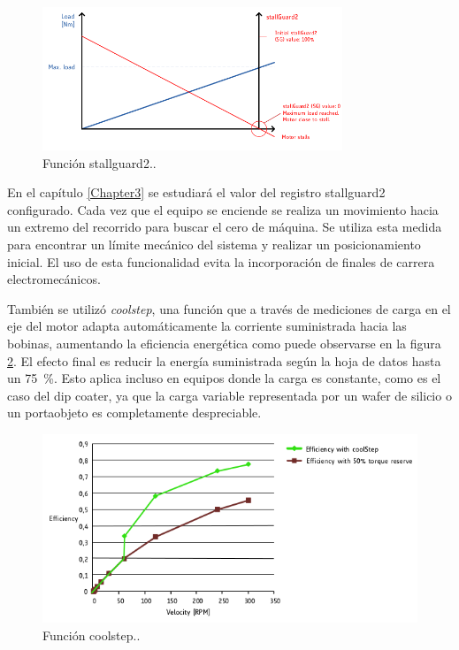 \begin{figure}[h]
\centering 
\includegraphics[width=0.8\textwidth]{./Figures/tmc5130_stallguard2.png}
\caption{Función stallguard2.\protect\footnotemark.}
\label{fig:tmc5130_stallGuard2}
\end{figure}


En el capítulo \ref{Chapter3} se estudiará el valor del registro  stallguard2 configurado. Cada vez que el equipo se enciende se realiza un movimiento hacia un extremo del recorrido para buscar el cero de máquina. Se utiliza esta medida para encontrar un límite mecánico del sistema y realizar  un posicionamiento inicial. El uso de esta funcionalidad evita la incorporación de finales de carrera electromecánicos.   


También se utilizó \textit{coolstep}, una función que a través de mediciones de carga en el eje del motor adapta automáticamente la corriente suministrada hacia las bobinas, aumentando la eficiencia energética como puede observarse en la figura \ref{fig:tmc5130_coolStep}. El efecto final es reducir la energía suministrada según la hoja de datos \citep{3_web_trinamic_producto} hasta un \SI{75}{\percent}. Esto aplica incluso en equipos donde la carga es constante, como es el caso del dip coater, ya que la carga variable representada por un wafer de silicio o un portaobjeto es completamente despreciable.

\begin{figure}[h]
\centering 
\includegraphics[width=1\textwidth]{./Figures/tmc5130_coolstep.png}
\caption{Función coolstep.\protect\footnotemark.}
\label{fig:tmc5130_coolStep}
\end{figure}

